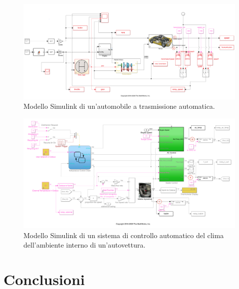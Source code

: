 \documentclass[Lau,binding=0.6cm]{sapthesis}
\begin{document}
\begin{figure}
    \includegraphics[scale=0.38]{car.png}
    \centering
    \caption{Modello Simulink di un'automobile a trasmissione automatica.}
    \label{fig:1}
\end{figure}

\begin{figure}
    \includegraphics[scale=0.45]{climate.png}
    \centering
    \caption{Modello Simulink di un sistema di controllo automatico del clima dell'ambiente interno di un'autovettura.}
    \label{fig:2}
\end{figure}

\chapter{Conclusioni}

\backmatter
\end{document}
